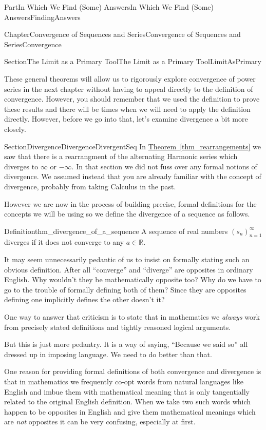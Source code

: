 \documentclass[oneside,10pt,]{book}
\newcommand{\xreffont}{\relax}
\numberwithin{equation}{part}
\newcommand{\RR}{\mathbb {R}}
\begin{document}
\begin{partptx}{Part}{In Which We Find (Some) Answers}{}{In Which We Find (Some) Answers}{}{}{FindingAnswers}
\begin{chapterptx}{Chapter}{Convergence of Sequences and Series}{}{Convergence of Sequences and Series}{}{}{Convergence}
\begin{sectionptx}{Section}{The Limit as a Primary Tool}{}{The Limit as a Primary Tool}{}{}{LimitAsPrimary}
\par
These general theorems will allow us to rigorously explore convergence of power series in the next chapter without having to appeal directly to the definition of convergence. However, you should remember that we used the definition to prove these results and there will be times when we will need to apply the definition directly. However, before we go into that, let's examine divergence a bit more closely.%
\end{sectionptx}
%
%
\typeout{************************************************}
\typeout{************************************************}
%
\begin{sectionptx}{Section}{Divergence}{}{Divergence}{}{}{DivergentSeq}
In \hyperref[thm_rearrangements]{Theorem~{\xreffont\ref{thm_rearrangements}}} we saw that there is a rearrangment of the alternating Harmonic series which diverges to \(\infty\) or \(-\infty\). In that section we did not fuss over any formal notions of divergence. We assumed instead that you are already familiar with the concept of divergence, probably from taking Calculus in the past.%
\par
However we are now in the process of building precise, formal definitions for the concepts we will be using so we define the divergence of a sequence as follows.%
\begin{definition}{Definition}{}{thm_divergence_of_a_sequence}%
 A sequence of real numbers \(\left(s_n\right)_{n=1}^\infty\) diverges if it does not converge to any \(a\in\RR\).%
\end{definition}
It may seem unnecessarily pedantic of us to insist on formally stating such an obvious definition. After all ``converge'' and ``diverge'' are opposites in ordinary English. Why wouldn't they be mathematically opposite too? Why do we have to go to the trouble of formally defining both of them? Since they are opposites defining one implicitly defines the other doesn't it?%
\par
One way to answer that criticism is to state that in mathematics we \emph{always} work from precisely stated definitions and tightly reasoned logical arguments.%
\par
But this is just more pedantry. It is a way of saying, ``Because we said so'' all dressed up in imposing language. We need to do better than that.%
\par
One reason for providing formal definitions of both convergence and divergence is that in mathematics we frequently co-opt words from natural languages like English and imbue them with mathematical meaning that is only tangentially related to the original English definition. When we take two such words which happen to be opposites in English and give them mathematical meanings which are \emph{not} opposites it can be very confusing, especially at first.%

\end{sectionptx}
\end{chapterptx}
\end{partptx}
\end{document}
